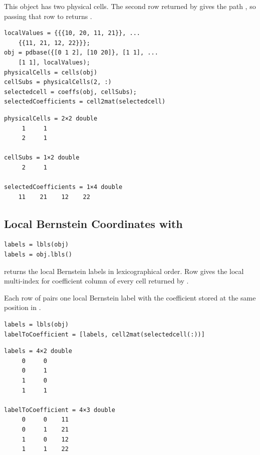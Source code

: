 \examplehead
This object has two physical cells. The second row returned by  gives the path \code{[2 1]}, so passing that row to  returns .

\begin{lstlisting}[style=dpmatlab]
localValues = {{{10, 20, 11, 21}}, ...
    {{11, 21, 12, 22}}};
obj = pdbase({[0 1 2], [10 20]}, [1 1], ...
    [1 1], localValues);
physicalCells = cells(obj)
cellSubs = physicalCells(2, :)
selectedcell = coeffs(obj, cellSubs);
selectedCoefficients = cell2mat(selectedcell)
\end{lstlisting}

\begin{lstlisting}[style=dpoutput]
physicalCells = 2×2 double
     1     1
     2     1

cellSubs = 1×2 double
     2     1

selectedCoefficients = 1×4 double
    11    21    12    22
\end{lstlisting}

\subsection{Local Bernstein Coordinates with \texorpdfstring{}{lbls}}

\label{subsec:pdbase-lbls}
\syntaxhead
\begin{lstlisting}[style=dpsyntax]
labels = lbls(obj)
labels = obj.lbls()
\end{lstlisting}

\arghead
{} returns the local Bernstein labels in lexicographical order. Row  gives the local multi-index for coefficient column  of every cell returned by .

\examplehead
Each row of  pairs one local Bernstein label with the coefficient stored at the same position in .

\begin{lstlisting}[style=dpmatlab]
labels = lbls(obj)
labelToCoefficient = [labels, cell2mat(selectedcell(:))]
\end{lstlisting}

\begin{lstlisting}[style=dpoutput]
labels = 4×2 double
     0     0
     0     1
     1     0
     1     1

labelToCoefficient = 4×3 double
     0     0    11
     0     1    21
     1     0    12
     1     1    22
\end{lstlisting}

